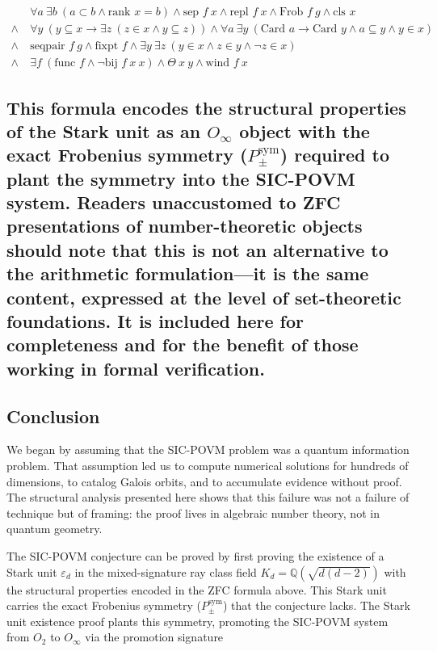 \documentclass[12pt,a4paper]{article}
\begin{document}
\[
\begin{aligned}
&\forall a\ \exists b\ (a \subset b \land \text{rank } x = b) \land \text{sep } f \ x \land \text{repl } f \ x \land \text{Frob } f \ g \land \text{cls } x \\
\land\ &\forall y\ (y \subseteq x \rightarrow \exists z\ (z \in x \land y \subseteq z)) \land \forall a\ \exists y\ (\text{Card } a \rightarrow \text{Card } y \land a \subseteq y \land y \in x) \\
\land\ &\text{seqpair } f \ g \land \text{fixpt } f \land \exists y\ \exists z\ (y \in x \land z \in y \land \lnot z \in x) \\
\land\ &\exists f\ (\text{func } f \land \lnot \text{bij } f \ x \ x) \land \Theta \ x \ y \land \text{wind } f \ x
\end{aligned}
\]

\subsection{This formula encodes the structural properties of the Stark unit as an $O_{\infty}$ object with the exact Frobenius symmetry ($P_{\pm}^{\text{sym}}$) required to plant the symmetry into the SIC-POVM system. Readers unaccustomed to ZFC presentations of number-theoretic objects should note that this is not an alternative to the arithmetic formulation---it is the same content, expressed at the level of set-theoretic foundations. It is included here for completeness and for the benefit of those working in formal verification.}

\subsection{Conclusion}

We began by assuming that the SIC-POVM problem was a quantum information problem. That assumption led us to compute numerical solutions for hundreds of dimensions, to catalog Galois orbits, and to accumulate evidence without proof. The structural analysis presented here shows that this failure was not a failure of technique but of framing: the proof lives in algebraic number theory, not in quantum geometry.

The SIC-POVM conjecture can be proved by first proving the existence of a Stark unit $\varepsilon_d$ in the mixed-signature ray class field $K_d = \mathbb{Q}(\sqrt{d(d-2)})$ with the structural properties encoded in the ZFC formula above. This Stark unit carries the exact Frobenius symmetry ($P_{\pm}^{\text{sym}}$) that the conjecture lacks. The Stark unit existence proof plants this symmetry, promoting the SIC-POVM system from $O_2$ to $O_{\infty}$ via the promotion signature
\end{document}

